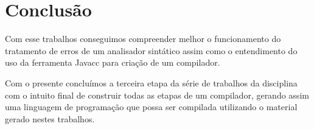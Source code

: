 \documentclass[
	article,			%
	11pt,				%
	oneside,			%
	a4paper,			%
	portuguese,			%
	brazil,				%
	sumario=tradicional
	]{abntex2}
\begin{document}
\newpage
\section{Conclusão}

Com esse trabalhos conseguimos compreender melhor o funcionamento do tratamento de erros de um analisador sintático assim como o entendimento do uso da ferramenta Javacc para criação de um compilador.

Com o presente concluímos a terceira etapa da série de trabalhos da disciplina com o intuito final de construir todas as etapas de um compilador, gerando assim uma linguagem de programação que possa ser compilada utilizando o material gerado nestes trabalhos.

\end{document}

